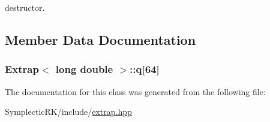 destructor. 



\subsection{Member Data Documentation}
\hypertarget{classExtrap_3_01long_01double_01_4_abc85e0bb8c91a709fea22f44a85195d6}{
\subsubsection[{q}]{ {\bf Extrap}$<$ long double $>$\-::q\mbox{[}64\mbox{]}\hspace{0.3cm}{\ttfamily [protected]}}}\label{classExtrap_3_01long_01double_01_4_abc85e0bb8c91a709fea22f44a85195d6}


The documentation for this class was generated from the following file\-:\begin{DoxyCompactItemize}
\item 
Symplectic\-R\-K/include/\hyperlink{extrap_8hpp}{extrap.\-hpp}\end{DoxyCompactItemize}
